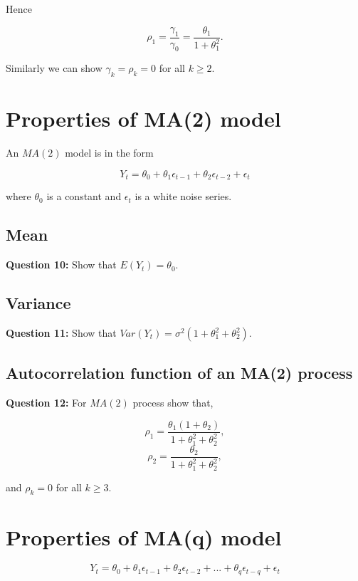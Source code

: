 \documentclass[
  11pt,
  a4paper,
]{report}
\begin{document}
Hence

\[\rho_1=\frac{\gamma_1}{\gamma_0}=\frac{\theta_1}{1+\theta_1^2}.\]

Similarly we can show \(\gamma_k=\rho_k=0\) for all \(k \geq 2\).

\section{Properties of MA(2) model}\label{properties-of-ma2-model}

An \(MA(2)\) model is in the form

\begin{equation}
Y_t = \theta_0 + \theta_1 \epsilon_{t-1} + \theta_2 \epsilon_{t-2} + \epsilon_t
\end{equation}

where \(\theta_0\) is a constant and \({\epsilon_t}\) is a white noise
series.

\subsection{Mean}\label{mean-4}

\textbf{Question 10: } Show that \(E(Y_t) = \theta_0.\)

\subsection{Variance}\label{variance-3}

\textbf{Question 11: } Show that
\(Var(Y_t) = \sigma^2 (1+\theta_1^2 + \theta_2^2).\)

\subsection{Autocorrelation function of an MA(2)
process}\label{autocorrelation-function-of-an-ma2-process}

\textbf{Question 12: }For \(MA(2)\) process show that,

\[\rho_1=\frac{\theta_1(1+\theta_2)}{1+\theta_1^2+\theta_2^2},\]
\[\rho_2 = \frac{\theta_2}{1+\theta_1^2 + \theta_2^2},\]

and \(\rho_k=0\) for all \(k \geq 3.\)

\section{Properties of MA(q) model}\label{properties-of-maq-model}

\begin{equation}
Y_t = \theta_0 + \theta_1 \epsilon_{t-1} + \theta_2 \epsilon_{t-2} +...+ \theta_q \epsilon_{t-q} +\epsilon_t
\end{equation}
\end{document}
